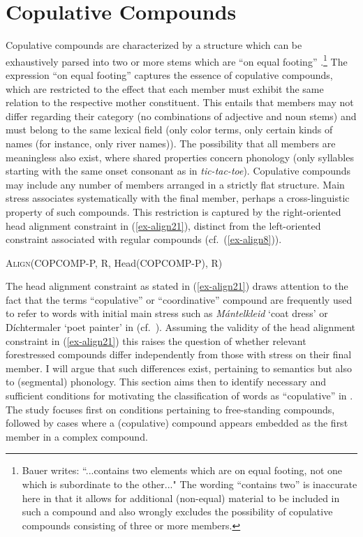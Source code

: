 \documentclass[output=paper
 ,nobabel
 ,draftmode
 ,colorlinks, citecolor=brown
]{langscibook}
\begin{document}
\section{Copulative Compounds}
\label{sec-copcom}

Copulative compounds are characterized by a structure which can be exhaustively parsed into two or more stems which are “on equal footing” \citep[83]{Bauer2017}.\footnote{Bauer writes: “...contains two elements which are on equal footing, not one which is subordinate to the other..." The wording “contains two” is inaccurate here in that it allows for additional (non-equal) material to be included in such a compound and also wrongly excludes the possibility of copulative compounds consisting of three or more members.}
The expression “on equal footing” captures the essence of copulative compounds, which are restricted to the effect that each member must exhibit the same relation to the respective mother constituent. This entails that members may not differ regarding their category (\eg no combinations of adjective and noun stems) and must belong to the same lexical field (\eg only color terms, only certain kinds of names (for instance, only river names)). The possibility that all members are meaningless also exist, where shared properties concern phonology (\eg only syllables starting with the same onset consonant as in  \emph{tic-tac-toe}). Copulative compounds may include any number of members arranged in a strictly flat structure. Main stress associates systematically with the final member, perhaps a cross-linguistic property of such compounds. This restriction is captured by the right-oriented head alignment constraint in (\ref{ex-align21}), distinct from the left-oriented constraint associated with regular compounds (cf.\ (\ref{ex-align8})). 

\ea\label{ex-align21}
\textsc{Align}(COPCOMP-P, R, Head(COPCOMP-P), R)
\z

\noindent
The head alignment constraint as stated in (\ref{ex-align21}) draws attention to the fact that the terms “copulative” or “coordinative” compound are frequently used to refer to words with initial main stress such as \emph{Mántelkleid} `coat dress' or {Díchtermaler} `poet painter' in  (cf.\ \citealp{OrtnerOrtner1984}). Assuming the validity of the head alignment constraint in (\ref{ex-align21}) this raises the question of whether relevant forestressed compounds differ independently  from those with stress on their final member. I will argue that such differences exist, pertaining to semantics but also to (segmental) phonology. This section aims then to identify necessary and sufficient conditions for motivating the classification of words as “copulative” in . The study focuses first on conditions pertaining to free-standing compounds, followed by cases where a (copulative) compound appears embedded as the first member in a complex compound.  
\end{document}
